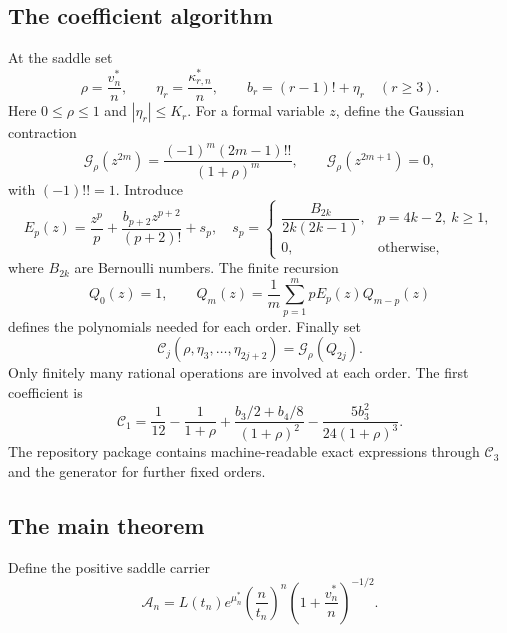 \documentclass[11pt,a4paper]{article}
\numberwithin{equation}{section}
\theoremstyle{definition}\newtheorem{definition}[theorem]{Definition}
\theoremstyle{remark}\newtheorem{remark}[theorem]{Remark}
\newcommand{\Cj}{\mathscr C}
\newcommand{\A}{\mathcal A}
\begin{document}
\subsection{The coefficient algorithm}
At the saddle set
\begin{equation}\label{eq:parameters}
 \rho=\frac{v_n^*}{n},\qquad
 \eta_r=\frac{\kappa_{r,n}^*}{n},\qquad
 b_r=(r-1)!+\eta_r\quad(r\ge3).
\end{equation}
Here $0\le\rho\le1$ and $|\eta_r|\le K_r$. For a formal variable $z$, define the Gaussian contraction
\begin{equation}\label{eq:contraction}
 \mathcal G_\rho(z^{2m})=\frac{(-1)^m(2m-1)!!}{(1+\rho)^m},
 \qquad \mathcal G_\rho(z^{2m+1})=0,
\end{equation}
with $(-1)!!=1$. Introduce
\begin{equation}\label{eq:Ep}
 E_p(z)=\frac{z^p}{p}+\frac{b_{p+2}z^{p+2}}{(p+2)!}+s_p,
 \quad
 s_p=\begin{cases}
 \dfrac{B_{2k}}{2k(2k-1)},&p=4k-2,\ k\ge1,\\
 0,&\text{otherwise},
 \end{cases}
\end{equation}
where $B_{2k}$ are Bernoulli numbers. The finite recursion
\begin{equation}\label{eq:Qrec}
 Q_0(z)=1,\qquad
 Q_m(z)=\frac1m\sum_{p=1}^{m}pE_p(z)Q_{m-p}(z)
\end{equation}
defines the polynomials needed for each order. Finally set
\begin{equation}\label{eq:Cdef}
 \Cj_j(\rho,\eta_3,\ldots,\eta_{2j+2})=\mathcal G_\rho(Q_{2j}).
\end{equation}
Only finitely many rational operations are involved at each order. The first coefficient is
\begin{equation}\label{eq:C1}
 \Cj_1=\frac1{12}-\frac1{1+\rho}
 +\frac{b_3/2+b_4/8}{(1+\rho)^2}
 -\frac{5b_3^2}{24(1+\rho)^3}.
\end{equation}
The repository package contains machine-readable exact expressions through $\Cj_3$ and the generator for further fixed orders.

\subsection{The main theorem}
Define the positive saddle carrier
\begin{equation}\label{eq:carrier}
 \A_n=L(t_n)e^{\mu_n^*}\left(\frac n{t_n}\right)^n
                \left(1+\frac{v_n^*}{n}\right)^{-1/2}.
\end{equation}
\end{document}
